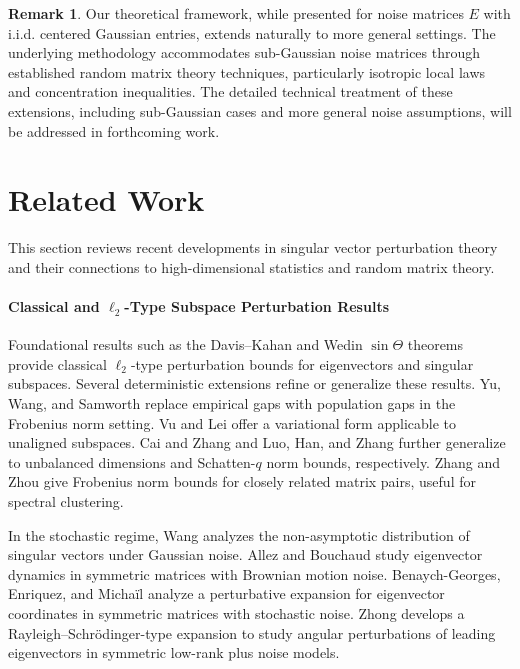 \documentclass[reqno]{amsart}
\theoremstyle{plain}
\theoremstyle{definition}
\newtheorem{remark}[theorem]{Remark}
\begin{document}
\begin{remark}\label{rem:gaussian-var}
Our theoretical framework, while presented for noise matrices $E$ with i.i.d. centered Gaussian entries, extends naturally to more general settings. The underlying methodology accommodates sub-Gaussian noise matrices through established random matrix theory techniques, particularly isotropic local laws and concentration inequalities. The detailed technical treatment of these extensions, including sub-Gaussian cases and more general noise assumptions, will be addressed in forthcoming work.
\end{remark}



\section{Related Work}\label{sec:literature}

This section reviews recent developments in singular vector perturbation theory and their connections to high-dimensional statistics and random matrix theory. 

\paragraph*{Classical and \texorpdfstring{$\ell_2$}{l2}-Type Subspace Perturbation Results}
Foundational results such as the Davis--Kahan and Wedin $\sin\Theta$ theorems \cite{DK,Wedin} provide classical $\ell_2$-type perturbation bounds for eigenvectors and singular subspaces. Several deterministic extensions refine or generalize these results. Yu, Wang, and Samworth \cite{YWS15} replace empirical gaps with population gaps in the Frobenius norm setting. Vu and Lei \cite{VL13} offer a variational form applicable to unaligned subspaces. Cai and Zhang \cite{CZ18} and Luo, Han, and Zhang \cite{LHZ21} further generalize to unbalanced dimensions and Schatten-$q$ norm bounds, respectively. Zhang and Zhou \cite{ZZ22} give Frobenius norm bounds for closely related matrix pairs, useful for spectral clustering.

In the stochastic regime, Wang \cite{MR3310977} analyzes the non-asymptotic distribution of singular vectors under Gaussian noise. Allez and Bouchaud \cite{MR3256861} study eigenvector dynamics in symmetric matrices with Brownian motion noise. Benaych-Georges, Enriquez, and  Micha\"il  \cite{MR4260218} analyze a perturbative expansion for eigenvector coordinates in symmetric matrices with stochastic noise. Zhong \cite{Zhong17} develops a Rayleigh--Schr\"odinger-type expansion to study angular perturbations of leading eigenvectors in symmetric low-rank plus noise models.
\end{document}
